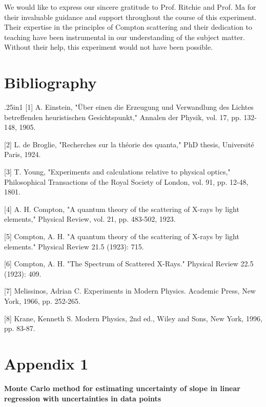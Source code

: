 We would like to express our sincere gratitude to Prof. Ritchie and Prof. Ma for their invaluable guidance and support throughout the course of this experiment. Their expertise in the principles of Compton scattering and their dedication to teaching have been instrumental in our understanding of the subject matter. Without their help, this experiment would not have been possible. 

\section{Bibliography}

\begin{hangparas}{.25in}{1}
[1] A. Einstein, "Über einen die Erzeugung und Verwandlung des Lichtes betreffenden heuristischen Gesichtspunkt," Annalen der Physik, vol. 17, pp. 132-148, 1905.

[2] L. de Broglie, "Recherches sur la théorie des quanta," PhD thesis, Université Paris, 1924.

[3] T. Young, "Experiments and calculations relative to physical optics," Philosophical Transactions of the Royal Society of London, vol. 91, pp. 12-48, 1801.

[4] A. H. Compton, "A quantum theory of the scattering of X-rays by light elements," Physical Review, vol. 21, pp. 483-502, 1923.

[5] Compton, A. H. "A quantum theory of the scattering of X-rays by light elements." Physical Review 21.5 (1923): 715.

[6] Compton, A. H. "The Spectrum of Scattered X-Rays." Physical Review 22.5 (1923): 409.

[7] Melissinos, Adrian C. Experiments in Modern Physics. Academic Press, New York, 1966, pp. 252-265.

[8] Krane, Kenneth S. Modern Physics, 2nd ed., Wiley and Sons, New York, 1996, pp. 83-87.
\end{hangparas}
\newpage

\section*{Appendix 1}

\textbf{Monte Carlo method for estimating uncertainty of slope in linear regression with uncertainties in data points}

